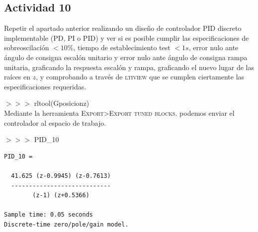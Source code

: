\newpage
\subsection{Actividad 10}
Repetir el apartado anterior realizando un diseño de controlador
PID discreto implementable (PD, PI o PID) y ver si es posible cumplir
las especificaciones de sobreoscilación $< 10 \%$, tiempo de
establecimiento test $< 1 s$, error nulo ante ángulo de consigna
escalón unitario y error nulo ante ángulo de consigna rampa unitaria,
graficando la respuesta escalón y rampa, graficando el nuevo lugar de
las raíces en $z$, y comprobando a través de \textsc{ltiview} que se
cumplen ciertamente las especificaciones requeridas.

\begin{tcolorbox}[sharp corners, colframe=bluebox, title= Controlador
  PID con sobreoscilamiento $< 10\%$ y $t_{est} < 1$.,breakable=unlimited]
  $>>>$ rltool(Gposicionz)\\
  \vspace*{0.35em}
\vspace*{0.35em}
Mediante la herramienta \textsc{Export>Export tuned blocks.} podemos
enviar el controlador al espacio de trabajo.

$>>>$ PID\_10
\vspace*{0.35em}
\begin{tcolorbox}[sharp corners, colback = white]
    \color{gray}
\begin{verbatim}
PID_10 =
 
  41.625 (z-0.9945) (z-0.7613)
  ----------------------------
        (z-1) (z+0.5366)
 
Sample time: 0.05 seconds
Discrete-time zero/pole/gain model.
\end{verbatim}
  \end{tcolorbox}%
  \vspace*{0.5em}
\end{tcolorbox}%


